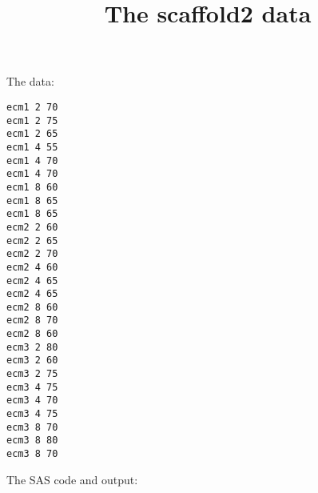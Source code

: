 \documentclass{article}
\title{The scaffold2 data}
\begin{document}
\maketitle
The data:
\begin{verbatim}
ecm1 2 70
ecm1 2 75
ecm1 2 65
ecm1 4 55
ecm1 4 70
ecm1 4 70
ecm1 8 60
ecm1 8 65
ecm1 8 65
ecm2 2 60
ecm2 2 65
ecm2 2 70
ecm2 4 60
ecm2 4 65
ecm2 4 65
ecm2 8 60
ecm2 8 70
ecm2 8 60
ecm3 2 80
ecm3 2 60
ecm3 2 75
ecm3 4 75
ecm3 4 70
ecm3 4 75
ecm3 8 70
ecm3 8 80
ecm3 8 70
\end{verbatim}
The SAS code and output:
\end{document}
